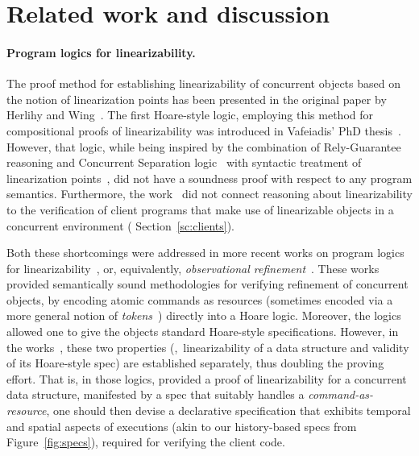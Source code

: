 \section{Related work and discussion}
\label{sc:related}


\paragraph{Program logics for linearizability.}

The proof method for establishing linearizability of concurrent
objects based on the notion of linearization points has been
presented in the original paper by Herlihy and
Wing~\cite{HerlihyW+TOPLAS90}. The first Hoare-style logic, employing
this method for compositional proofs of linearizability was introduced
in Vafeiadis' PhD thesis~\cite{Vafeiadis+PhD07}. However, that logic,
while being inspired by the combination of Rely-Guarantee reasoning
and Concurrent Separation logic~\cite{VafeiadisP+CONCUR07} with
syntactic treatment of linearization
points~\cite{VafeiadisHHS+PPoPP06}, did not have a soundness proof
with respect to any program semantics. Furthermore, the
work~\cite{Vafeiadis+PhD07} did not connect reasoning about
linearizability to the verification of client programs that make use
of linearizable objects in a concurrent environment (\cf
Section~\ref{sc:clients}).


Both these shortcomings were addressed in more recent works on program
logics for linearizability~\cite{LiangF+PLDI13,Khyzha-al:FM16}, or,
equivalently, \emph{observational
  refinement}~\cite{FilipovicOHRW+TCS10,TuronDB+ICFP13}. These works
provided semantically sound methodologies for verifying refinement of
concurrent objects, by encoding atomic commands as resources
(sometimes encoded via a more general notion of
\emph{tokens}~\cite{Khyzha-al:FM16}) directly into a Hoare
logic. Moreover, the logics~\cite{LiangF+PLDI13, TuronDB+ICFP13}
allowed one to give the objects standard Hoare-style specifications.
%
However, in the works~\cite{LiangF+PLDI13,TuronDB+ICFP13}, these two
properties (\ie,~linearizability of a data structure and validity of
its Hoare-style spec) are established separately, thus doubling the
proving effort.
%
That is, in those logics, provided a proof of linearizability for a
concurrent data structure, manifested by a spec that suitably handles
a \emph{command-as-resource}, one should then devise a declarative
specification that exhibits temporal and spatial aspects of executions
(akin to our history-based specs from Figure~\ref{fig:specs}),
required for verifying the client code.

